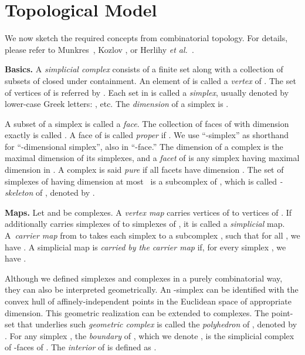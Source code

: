 \documentclass[11pt]{article}
\begin{document}
\section{Topological Model}
\label{Sec-TopologicalModel}

We now sketch the required concepts from combinatorial topology.
For details, please refer to Munkres~\cite{Munkres84}, Kozlov \cite{Kozlov07}, or Herlihy \emph{et al.}~\cite{MauriceBook}.





\textbf{Basics. }
A \emph{simplicial complex}  consists of a finite set 
along with a collection of subsets of  closed under containment.
An element of  is called a \emph{vertex} of .
The set of vertices of  is referred by .
Each set in  is called a \emph{simplex},
usually denoted by lower-case Greek letters: , etc.
The \emph{dimension}  of a simplex  is .

A subset of a simplex is called a \emph{face}.
The collection of faces of  with dimension exactly  is called .
A face  of  is called \emph{proper} if .
We use ``-simplex'' as shorthand for ``-dimensional simplex'',
also in ``-face.''
The dimension  of a complex is the maximal dimension of its simplexes,
and a \emph{facet} of  is any simplex having maximal dimension in .
A complex is said \emph{pure} if all facets have dimension .
The set of simplexes of 
having dimension at most~ is a subcomplex of ,
which is called \emph{-skeleton} of ,
denoted by .
 


\textbf{Maps. }
Let  and  be complexes.
A \emph{vertex map}  carries vertices of  to vertices of .
If  additionally carries simplexes of  to simplexes of ,
it is called a \emph{simplicial} map.
A~\emph{carrier map}  from  to  takes each
simplex  to a subcomplex ,
such that for all ,
we have .
A simplicial map  is \emph{carried by the carrier map}
 if, for every simplex ,
we have .

Although we defined simplexes and complexes in a purely combinatorial way,
they can also be interpreted geometrically.
An -simplex can be identified with the convex hull of 
affinely-independent points in the Euclidean space of appropriate dimension.
This geometric realization can be extended to complexes.
The point-set that underlies such \emph{geometric complex}  is called
the \emph{polyhedron} of , denoted by .
For any simplex , the \emph{boundary} of , which we denote ,
is the simplicial complex of -faces of .
The \emph{interior} of  is defined as
.
\end{document}
